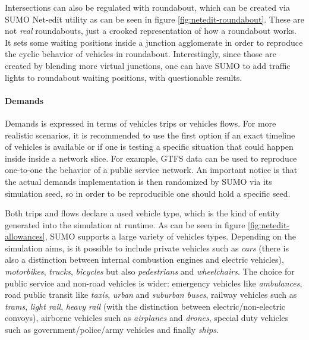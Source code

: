 
Intersections can also be regulated with roundabout, which can be created via SUMO Net-edit utility as can be seen in figure \ref{fig:netedit-roundabout}. These are not \textit{real} roundabouts, just a crooked representation of how a roundabout works. It sets some waiting positions inside a junction agglomerate in order to reproduce the cyclic behavior of vehicles in roundabout.
Interestingly, since those are created by blending more virtual junctions, one can have SUMO to add traffic lights to roundabout waiting positions, with questionable results.


\paragraph{Demands}

Demands is expressed in terms of vehicles trips or vehicles flows. For more realistic scenarios, it is recommended to use the first option if an exact timeline of vehicles is available or if one is testing a specific situation that could happen inside inside a network slice. For example, GTFS data can be used to reproduce one-to-one the behavior of a public service network. An important notice is that the actual demands implementation is then randomized by SUMO via its simulation seed, so in order to be reproducible one should hold a specific seed.

Both trips and flows declare a used vehicle type, which is the kind of entity generated into the simulation at runtime. As can be seen in figure \ref{fig:netedit-allowances}, SUMO supports a large variety of vehicles types. Depending on the simulation aims, is it possible to include private vehicles such as \textit{cars} (there is also a distinction between internal combustion engines and electric vehicles), \textit{motorbikes}, \textit{trucks}, \textit{bicycles} but also \textit{pedestrians} and \textit{wheelchairs}. The choice for public service and non-road vehicles is wider: emergency vehicles like \textit{ambulances}, road public transit like \textit{taxis}, \textit{urban} and \textit{suburban buses}, railway vehicles such as \textit{trams}, \textit{light rail}, \textit{heavy rail} (with the distinction between electric/non-electric convoys), airborne vehicles such as \textit{airplanes} and \textit{drones}, special duty vehicles such as government/police/army vehicles and finally \textit{ships}. 

